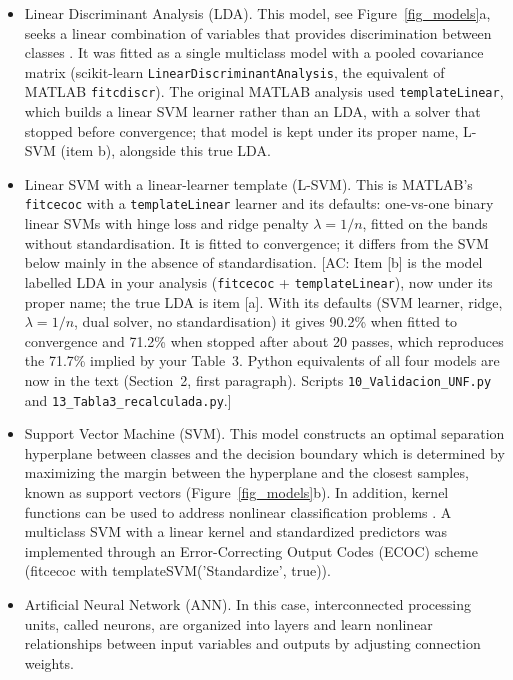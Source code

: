 \documentclass[final,5p,times,twocolumn]{elsarticle}
\newcommand{\added}[1]{{\color{blue}#1}}
\newcommand{\acnote}[1]{{\color{red}\small\textsf{[AC: #1]}}}
\begin{document}
\begin{itemize}
    \item [a] Linear Discriminant Analysis (LDA).
    This model, see Figure~\ref{fig_models}a, seeks a linear combination of variables that provides discrimination between classes \cite{Rahmani2022}.
    \added{It was fitted as a single multiclass model with a pooled covariance matrix (scikit-learn \texttt{LinearDiscriminantAnalysis}, the equivalent of MATLAB \texttt{fitcdiscr}). The original MATLAB analysis used \texttt{templateLinear}, which builds a linear SVM learner rather than an LDA, with a solver that stopped before convergence; that model is kept under its proper name, L-SVM (item b), alongside this true LDA.}
    \item [\added{b}] \added{Linear SVM with a linear-learner template (L-SVM). This is MATLAB's \texttt{fitcecoc} with a \texttt{templateLinear} learner and its defaults: one-vs-one binary linear SVMs with hinge loss and ridge penalty $\lambda=1/n$, fitted on the bands without standardisation. It is fitted to convergence; it differs from the SVM below mainly in the absence of standardisation.}
    \acnote{Item [b] is the model labelled LDA in your analysis (\texttt{fitcecoc} + \texttt{templateLinear}), now under its proper name; the true LDA is item [a]. With its defaults (SVM learner, ridge, $\lambda=1/n$, dual solver, no standardisation) it gives 90.2\% when fitted to convergence and 71.2\% when stopped after about 20 passes, which reproduces the 71.7\% implied by your Table~3. Python equivalents of all four models are now in the text (Section~2, first paragraph). Scripts \texttt{10\_Validacion\_UNF.py} and \texttt{13\_Tabla3\_recalculada.py}.}
    \item [\added{c}] Support Vector Machine (SVM).
    This model constructs an optimal separation hyperplane between classes and the decision boundary which is determined by maximizing the margin between the hyperplane and the closest samples, known as support vectors (Figure~\ref{fig_models}b). 
    \added{In addition,} kernel functions can be used to address nonlinear classification problems \cite{Onmarkhong2022, castro2019}.
    A multiclass SVM with a linear kernel and standardized predictors was implemented through an Error-Correcting Output Codes (ECOC) scheme (fitcecoc with templateSVM('Standardize', true)).
    \item [\added{d}] Artificial Neural Network (ANN).
    In this case, interconnected processing units, called neurons, are organized into layers and learn nonlinear relationships between input variables and outputs by adjusting connection weights. 

\end{itemize}
\end{document}
